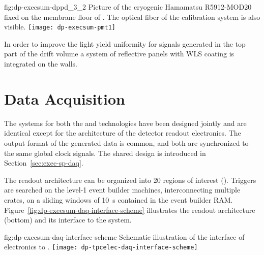 \begin{dunefigure}{fig:dp-execsum-dppd_3_2}
{Picture of the cryogenic Hamamatsu R5912-MOD20  fixed on the membrane floor of . The optical fiber of the calibration system is also visible.}
\texttt{[image: dp-execsum-pmt1]}
\end{dunefigure}

In order to improve the light yield uniformity for signals generated in the top part of the drift volume a system of reflective panels with WLS coating is integrated on the   walls.


\section{Data Acquisition}
\label{sec:dp-execsum-daq}

The  systems for both the  and  technologies have been designed jointly and are identical except for the architecture of the detector readout electronics.  The output format of the generated data is common, and both are synchronized to the same global clock signals. The shared  design is introduced in Section~\ref{sec:exec-sp-daq}.

The  readout architecture can be organized into \num{20} regions of interest (). %
Triggers are searched on the level-1 event builder machines, interconnecting multiple  crates, on a sliding windows of \SI{10}{s} contained in the event builder RAM.
Figure~\ref{fig:dp-execsum-daq-interface-scheme} illustrates the  readout architecture (bottom) and its interface to the  system.
  
\begin{dunefigure}{fig:dp-execsum-daq-interface-scheme}
{Schematic illustration of the interface of   electronics to .}
\texttt{[image: dp-tpcelec-daq-interface-scheme]}
\end{dunefigure}

